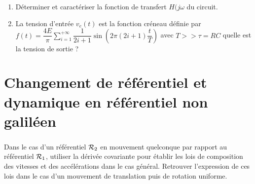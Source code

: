 \documentclass[a4paper,french,bookmarks]{book}
\begin{document}
    \subsection{}
    \begin{enumerate}
        \item Déterminer et caractériser la fonction de transfert \(H(j\omega\) du circuit.



        \item La tension d'entrée \(v_e(t)\) est la fonction créneau définie par \(f(t) = \dfrac{4E}{\pi} \sum_{i=1}^{+\infty} \dfrac{1}{2i+1} \sin \left( 2 \pi (2i+1) \dfrac{t}{T} \right)\) avec \(T >> \tau = RC\) quelle est la tension de sortie ?

    \end{enumerate}
    
    \chapter{Changement de référentiel et dynamique en référentiel non galiléen}
    
    \subsection{}
    
    Dans le cas d'un référentiel $\mathcal{R}_2$ en mouvement quelconque par rapport au référentiel $\mathcal{R}_1$, utiliser la dérivée covariante pour établir les lois de composition des vitesses et des accélérations dans le cas général. Retrouver l'expression de ces lois dans le cas d'un mouvement de translation puis de rotation uniforme.
    
\end{document}
